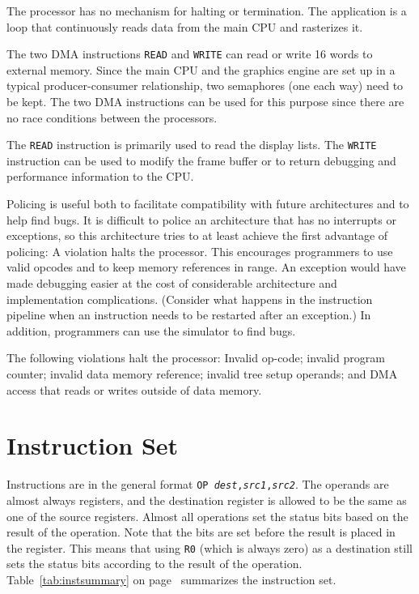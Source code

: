 \documentclass{book}
\begin{document}
The processor has no mechanism for halting or termination.  The
application is a loop that continuously reads data from the main CPU
and rasterizes it.


The two DMA instructions {\tt READ} and {\tt WRITE} can read or write
16 words to external memory.  Since the main CPU and the graphics
engine are set up in a typical producer-consumer relationship, two
semaphores (one each way) need to be kept.  The two DMA instructions
can be used for this purpose since there are no race conditions
between the processors.

The {\tt READ} instruction is primarily used to read the display
lists.  The {\tt WRITE} instruction can be used to modify the frame
buffer or to return debugging and performance information to the CPU.


Policing is useful both to facilitate compatibility with future
architectures and to help find bugs.  It is difficult to police an
architecture that has no interrupts or exceptions, so this
architecture tries to at least achieve the first advantage of
policing: A violation halts the processor.  This encourages
programmers to use valid opcodes and to keep memory references in
range.  An exception would have made debugging easier at the cost of
considerable architecture and implementation complications.  (Consider
what happens in the instruction pipeline when an instruction needs to
be restarted after an exception.)  In addition, programmers can use the
simulator to find bugs.

The following violations halt the processor: Invalid op-code; invalid
program counter; invalid data memory reference; invalid tree setup
operands; and DMA access that reads or writes outside of data memory.

\chapter{\label{chap:instset}Instruction Set}

Instructions are in the general format
{\tt OP {\em dest},{\em src1},{\em src2}}.  The operands are almost
always registers, and the destination register is allowed to be
the same as one of the source registers.  Almost all operations
set the status bits based on the result of the operation.  Note
that the bits are set before the result is placed in the register.
This means that using {\tt R0} (which is always zero) as a destination
still sets the status bits according to the result of the operation.
Table~\ref{tab:instsummary} on page~\pageref{tab:instsummary} summarizes
the instruction set.
\end{document}
